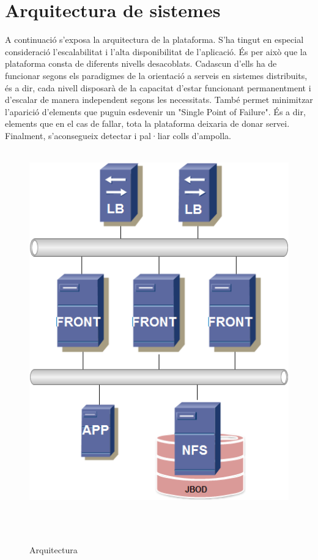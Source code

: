 \documentclass[a4paper, 11pt]{article}
\begin{document}
\section{Arquitectura de sistemes}

A continuació s'exposa la arquitectura de la plataforma. S'ha tingut en especial consideració l'escalabilitat i l'alta disponibilitat de l'aplicació. És per això que la plataforma consta de diferents nivells desacoblats. Cadascun d'ells ha de funcionar segons els paradigmes de la orientació a serveis en sistemes distribuits, és a dir, cada nivell disposarà de la capacitat d'estar funcionant permanentment i d'escalar de manera independent segons les necessitats. 
També permet minimitzar l'aparició d'elements que puguin esdevenir un "Single Point of Failure". És a dir, elements que en el cas de fallar, tota la plataforma deixaria de donar servei. Finalment, s’aconsegueix detectar i pal·liar colls d'ampolla.

\begin{figure}[H]
    \centering
    \includegraphics[width=1.0\textwidth]{IM}
    \caption{Arquitectura \label{fig:centralized}}    
\end{figure}
\end{document}
